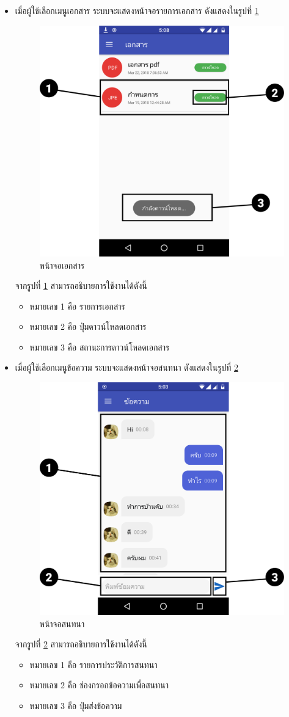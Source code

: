 \begin{enumerate}
\begin{itemize}
			\item เมื่อผู้ใช้เลือกเมนูเอกสาร ระบบจะแสดงหน้าจอรายการเอกสาร ดังแสดงในรูปที่ \ref{Fig:doc}
			\begin{figure}[H]
				\centering
				\includegraphics[width=0.5\columnwidth]{Figures/7/Manual/doc}
				\caption{หน้าจอเอกสาร}
				\label{Fig:doc}
			\end{figure}
			จากรูปที่ \ref{Fig:doc} สามารถอธิบายการใช้งานได้ดังนี้
			\begin{itemize}[label={--}]
				\item หมายเลข 1 คือ รายการเอกสาร
				\item หมายเลข 2 คือ ปุ่มดาวน์โหลดเอกสาร
				\item หมายเลข 3 คือ สถานะการดาวน์โหลดเอกสาร
			\end{itemize}
		
			\item เมื่อผู้ใช้เลือกเมนูข้อความ ระบบจะแสดงหน้าจอสนทนา ดังแสดงในรูปที่ \ref{Fig:chat}
			\begin{figure}[H]
				\centering
				\includegraphics[width=0.5\columnwidth]{Figures/7/Manual/chat}
				\caption{หน้าจอสนทนา}
				\label{Fig:chat}
			\end{figure}
			จากรูปที่ \ref{Fig:chat} สามารถอธิบายการใช้งานได้ดังนี้
			\begin{itemize}[label={--}]
				\item หมายเลข 1 คือ รายการประวัติการสนทนา
				\item หมายเลข 2 คือ ช่องกรอกข้อความเพื่อสนทนา
				\item หมายเลข 3 คือ ปุ่มส่งข้อความ
			\end{itemize}
		

\end{itemize}
\end{enumerate}
